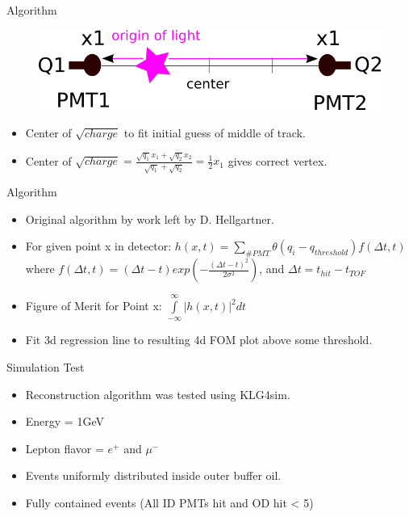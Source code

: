 \documentclass{beamer} %
\begin{document}
\begin{frame}{Algorithm}
	\begin{figure}
		\includegraphics[width=\textwidth,height=0.7\textheight,keepaspectratio]
			{material/center_of_sqrt_of_charge.png}
	\end{figure}
	\begin{itemize}
		\item Center of $\sqrt{charge}$ to fit initial guess of middle of track.
		\item Center of $\sqrt{charge} = \frac{\sqrt{q_1}x_1 +
			\sqrt{q_2}x_2}{\sqrt{q_1} + \sqrt{q_2}} = \frac{1}{2}x_1$
			gives correct vertex.
	\end{itemize}
\end{frame}

\begin{frame}{Algorithm}
	\begin{itemize}
		\item Original algorithm by work left by D. Hellgartner.
		\item For given point x in detector: $h(x,t) = \sum\limits_{\#PMT}
		\theta(q_i-q_{threshold})f(\Delta{t},t)$
		where $f(\Delta{t},t) = (\Delta{t} - t)exp(-\frac{(\Delta{t} -
					t)^2}{2\sigma^2})$, and $\Delta{t} = t_{hit} - t_{TOF}$
		\item Figure of Merit for Point x:
		$\int\limits_{-\infty}^{\infty}|h(x,t)|^2dt$
		\item Fit 3d regression line to resulting 4d FOM plot above some
		threshold.
	\end{itemize}
\end{frame}

\begin{frame}{Simulation Test}
	\begin{itemize}
		\item Reconstruction algorithm was tested using KLG4sim.
		\item Energy = 1GeV
		\item Lepton flavor = $e^+$ and $\mu^-$
		\item Events uniformly distributed inside outer buffer oil.
		\item Fully contained events (All ID PMTs hit and OD hit < 5)
	\end{itemize}
\end{frame}
\end{document}

